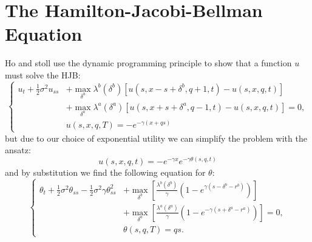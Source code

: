 \section{The Hamilton-Jacobi-Bellman Equation}
Ho and stoll use the dynamic programming principle to show that a function $u$ must solve the HJB:
\begin{equation}\label{eq:hjb-1}
    \left\{
        \begin{aligned}
            u_t+\frac{1}{2}\sigma^2u_{ss}&+\max\limits_{\delta^b}\lambda^b(\delta^b)[u(s,x-s+\delta^b,q+1,t)-u(s,x,q,t)]\\
            &+\max\limits_{\delta^a}\lambda^a(\delta^a)[u(s,x+s+\delta^a,q-1,t)-u(s,x,q,t)]=0,\\
            &u(s,x,q,T)=-e^{-\gamma(x+qs)}
        \end{aligned}
    \right.
\end{equation}
but due to our choice of exponential utility we can simplify the problem with the ansatz:
$$u(s,x,q,t)=-e^{-\gamma x}e^{-\gamma\theta(s,q,t)}$$
and by substitution we find the following equation for $\theta$:
\begin{equation}\label{eq:hjb-2}
    \left\{
        \begin{aligned}
            \theta_t+\frac{1}{2}\sigma^2\theta_{ss}-\frac{1}{2}\sigma^2\gamma\theta_{ss}^2&+\max\limits_{\delta^b}\left[\frac{\lambda^b(\delta^b)}{\gamma}(1-e^{\gamma(s-\delta^b-r^b)})\right]\\
            &+\max\limits_{\delta^a}\left[\frac{\lambda^a(\delta^a)}{\gamma}(1-e^{-\gamma(s+\delta^a-r^a)})\right]=0,\\
            &\theta(s,q,T)=qs.
        \end{aligned}
    \right.
\end{equation}
